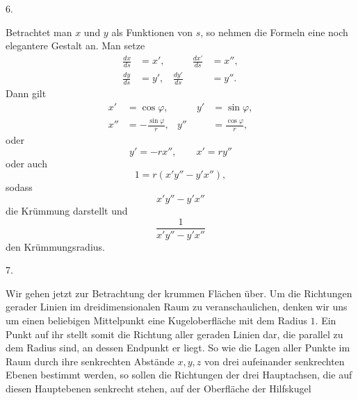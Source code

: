 %
\begin{center}6.\end{center}
\noindent\hspace*{1.2em}Betrachtet man $x$ und $y$ als Funktionen von $s$, so nehmen die Formeln eine noch elegantere Gestalt an. Man setze
\[
\begin{aligned}
\frac{dx}{ds}&=x',&\qquad \frac{dx'}{ds}&=x'',\\
\frac{dy}{ds}&=y',&\frac{dy'}{ds}&=y''.
\end{aligned}
\]
Dann gilt
\[
\begin{aligned}
x'&=\cos\varphi,&\qquad y'&=\sin\varphi,\\
x''&=-\frac{\sin\varphi}{r},&y''&=\frac{\cos\varphi}{r},
\end{aligned}
\]
oder
\[
y'=-rx'',\qquad x'=ry''
\]
oder auch
\[
1=r(x'y''-y'x''),
\]
sodass
\[
x'y''-y'x''
\]
die Krümmung darstellt und
\[
\frac{1}{x'y''-y'x''}
\]
den Krümmungsradius.

\begin{center}7.\end{center}
\noindent\hspace*{1.2em}Wir gehen jetzt zur Betrachtung der krummen Flächen über. Um die Richtungen gerader Linien im dreidimensionalen Raum zu veranschaulichen, denken wir uns um einen beliebigen Mittelpunkt eine Kugeloberfläche mit dem Radius $1$. Ein Punkt auf ihr stellt somit die Richtung aller geraden Linien dar, die parallel zu dem Radius sind, an dessen Endpunkt er liegt. So wie die Lagen aller Punkte im Raum durch ihre senkrechten Abstände $x,y,z$ von drei aufeinander senkrechten Ebenen bestimmt werden, so sollen die Richtungen der drei Hauptachsen, die auf diesen Hauptebenen senkrecht stehen, auf der Oberfläche der Hilfskugel\space%
